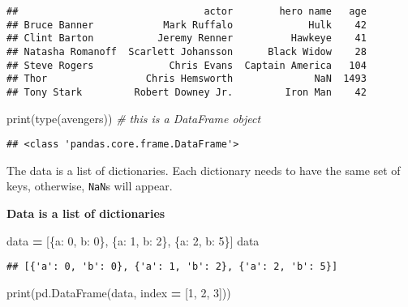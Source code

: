 \documentclass[
]{book}
\newenvironment{Shaded}{\begin{snugshade}}{\end{snugshade}}
\newcommand{\BuiltInTok}[1]{#1}
\newcommand{\CommentTok}[1]{\textcolor[rgb]{0.56,0.35,0.01}{\textit{#1}}}
\newcommand{\DecValTok}[1]{\textcolor[rgb]{0.00,0.00,0.81}{#1}}
\newcommand{\NormalTok}[1]{#1}
\newcommand{\OperatorTok}[1]{\textcolor[rgb]{0.81,0.36,0.00}{\textbf{#1}}}
\newcommand{\StringTok}[1]{\textcolor[rgb]{0.31,0.60,0.02}{#1}}
\begin{document}
\begin{verbatim}
##                                actor        hero name   age
## Bruce Banner            Mark Ruffalo             Hulk    42
## Clint Barton           Jeremy Renner          Hawkeye    41
## Natasha Romanoff  Scarlett Johansson      Black Widow    28
## Steve Rogers             Chris Evans  Captain America   104
## Thor                 Chris Hemsworth              NaN  1493
## Tony Stark         Robert Downey Jr.         Iron Man    42
\end{verbatim}

\begin{Shaded}
\begin{Highlighting}[]
\BuiltInTok{print}\NormalTok{(}\BuiltInTok{type}\NormalTok{(avengers)) }\CommentTok{\# this is a DataFrame object}
\end{Highlighting}
\end{Shaded}

\begin{verbatim}
## <class 'pandas.core.frame.DataFrame'>
\end{verbatim}

The data is a list of dictionaries. Each dictionary needs to have the same set of keys,
otherwise, \texttt{NaN}s will appear.

\textbf{Data is a list of dictionaries}

\begin{Shaded}
\begin{Highlighting}[]
\NormalTok{data }\OperatorTok{=}\NormalTok{ [\{}\StringTok{\textquotesingle{}a\textquotesingle{}}\NormalTok{: }\DecValTok{0}\NormalTok{, }\StringTok{\textquotesingle{}b\textquotesingle{}}\NormalTok{: }\DecValTok{0}\NormalTok{\},}
\NormalTok{        \{}\StringTok{\textquotesingle{}a\textquotesingle{}}\NormalTok{: }\DecValTok{1}\NormalTok{, }\StringTok{\textquotesingle{}b\textquotesingle{}}\NormalTok{: }\DecValTok{2}\NormalTok{\},}
\NormalTok{        \{}\StringTok{\textquotesingle{}a\textquotesingle{}}\NormalTok{: }\DecValTok{2}\NormalTok{, }\StringTok{\textquotesingle{}b\textquotesingle{}}\NormalTok{: }\DecValTok{5}\NormalTok{\}]}
\NormalTok{data}
\end{Highlighting}
\end{Shaded}

\begin{verbatim}
## [{'a': 0, 'b': 0}, {'a': 1, 'b': 2}, {'a': 2, 'b': 5}]
\end{verbatim}

\begin{Shaded}
\begin{Highlighting}[]
\BuiltInTok{print}\NormalTok{(pd.DataFrame(data, index }\OperatorTok{=}\NormalTok{ [}\DecValTok{1}\NormalTok{, }\DecValTok{2}\NormalTok{, }\DecValTok{3}\NormalTok{]))}
\end{Highlighting}
\end{Shaded}
\end{document}
